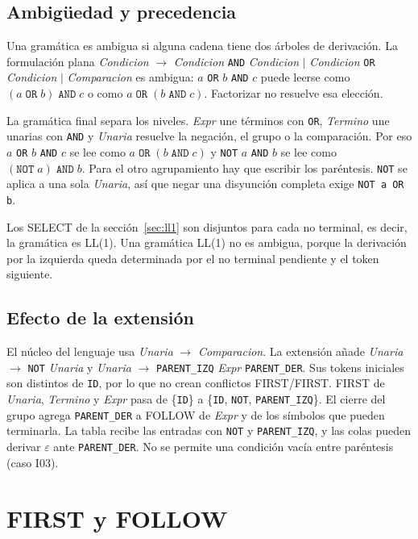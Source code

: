 \documentclass[11pt,a4paper]{article}
\newcommand{\tk}[1]{\texttt{#1}}
\newcommand{\nt}[1]{\textit{#1}}
\begin{document}
\subsection{Ambigüedad y precedencia}

Una gramática es ambigua si alguna cadena tiene dos árboles de
derivación. La formulación plana \nt{Condicion} $\to$
\nt{Condicion} \tk{AND} \nt{Condicion} $\mid$ \nt{Condicion}
\tk{OR} \nt{Condicion} $\mid$ \nt{Comparacion} es ambigua: $a$
\tk{OR} $b$ \tk{AND} $c$ puede leerse como $(a \;\tk{OR}\; b)
\;\tk{AND}\; c$ o como $a \;\tk{OR}\; (b \;\tk{AND}\; c)$.
Factorizar no resuelve esa elección.

La gramática final separa los niveles. \nt{Expr} une términos con
\tk{OR}, \nt{Termino} une unarias con \tk{AND} y \nt{Unaria}
resuelve la negación, el grupo o la comparación. Por eso $a$
\tk{OR} $b$ \tk{AND} $c$ se lee como $a \;\tk{OR}\; (b \;\tk{AND}\;
c)$ y \tk{NOT} $a$ \tk{AND} $b$ se lee como $(\tk{NOT}\; a)
\;\tk{AND}\; b$. Para el otro agrupamiento hay que escribir los
paréntesis. \tk{NOT} se aplica a una sola \nt{Unaria}, así que
negar una disyunción completa exige \tk{NOT a OR b}.

Los SELECT de la sección~\ref{sec:ll1} son disjuntos para cada no
terminal, es decir, la gramática es LL(1). Una gramática LL(1) no
es ambigua, porque la derivación por la izquierda queda determinada
por el no terminal pendiente y el token siguiente.

\subsection{Efecto de la extensión}

El núcleo del lenguaje usa \nt{Unaria} $\to$ \nt{Comparacion}. La
extensión añade \nt{Unaria} $\to$ \tk{NOT} \nt{Unaria} y
\nt{Unaria} $\to$ \tk{PARENT\_IZQ} \nt{Expr} \tk{PARENT\_DER}. Sus
tokens iniciales son distintos de \tk{ID}, por lo que no crean
conflictos FIRST/FIRST. FIRST de \nt{Unaria}, \nt{Termino} y
\nt{Expr} pasa de \{\tk{ID}\} a \{\tk{ID}, \tk{NOT},
\tk{PARENT\_IZQ}\}. El cierre del grupo agrega \tk{PARENT\_DER} a
FOLLOW de \nt{Expr} y de los símbolos que pueden terminarla. La
tabla recibe las entradas con \tk{NOT} y \tk{PARENT\_IZQ}, y las
colas pueden derivar $\varepsilon$ ante \tk{PARENT\_DER}. No se
permite una condición vacía entre paréntesis (caso I03).

\section{FIRST y FOLLOW}
\end{document}
